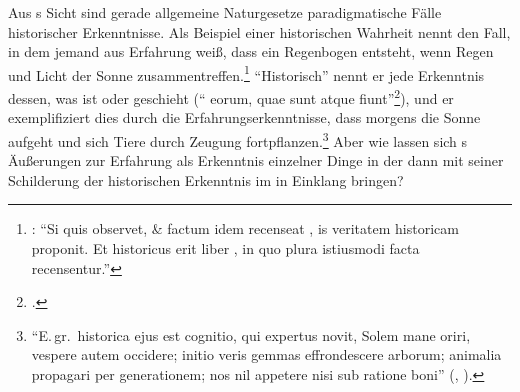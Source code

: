 Aus s Sicht sind gerade allgemeine Naturgesetze
paradigmatische Fälle historischer Erkenntnisse. Als Beispiel einer historischen
Wahrheit nennt  den Fall, in dem jemand aus Erfahrung
weiß, dass ein Regenbogen entsteht, wenn Regen und Licht der Sonne
zusammentreffen.\footnote{\cite[Vgl.][\S~744]{Wolff:PhilosophiarationalissiveLogica1740}:
\enquote{Si quis observet,  {\&} factum idem recenseat , is veritatem historicam proponit. Et
historicus erit liber , in quo plura istiusmodi facta recensentur.}}
\enquote{Historisch} nennt er jede Erkenntnis dessen, was ist oder geschieht
(\enquote{ eorum, quae sunt atque
fiunt}\footnote{\cite[][\S~3]{Wolff:Discursuspraeliminarisdephilosophiaingenere1996}.}),
und er exemplifiziert dies durch die Erfahrungserkenntnisse, dass morgens die
Sonne aufgeht und sich Tiere durch Zeugung
fortpflanzen.\footnote{\enquote{E.\,gr.\ historica ejus est cognitio, qui
expertus novit, Solem mane oriri, vespere autem occidere; initio veris gemmas
effrondescere arborum; animalia propagari per generationem; nos nil appetere
nisi sub ratione boni}
\mkbibparens{\cite[][\S~3]{Wolff:Discursuspraeliminarisdephilosophiaingenere1996},
\cite[vgl.][\pno~165\,f.]{Seifert:Cognitiohistorica1976}}.} Aber wie lassen sich
s Äußerungen zur Erfahrung als
Erkenntnis einzelner Dinge in der  dann mit seiner
Schilderung der historischen Erkenntnis im  in
Einklang bringen?

